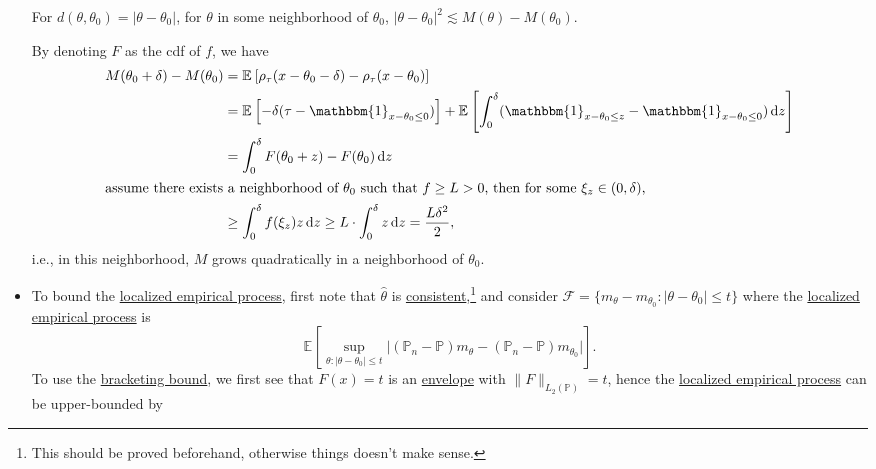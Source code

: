 \begin{explanation}
\begin{itemize}
		      \begin{claim}
			      For \(d(\theta , \theta _0) = \vert \theta - \theta _0 \vert \), for \(\theta \) in some neighborhood of \(\theta _0\), \(\vert \theta - \theta _0 \vert ^2 \lesssim M(\theta ) - M(\theta _0)\).
		      \end{claim}
		      \begin{explanation}
			      By denoting \(F\) as the cdf of \(f\), we have
			      \begin{align*}
				      M(\theta _0 + \delta ) - M(\theta _0)
				       & = \mathbb{E}_{}\left[\rho _\tau (x - \theta _0 - \delta ) - \rho _\tau (x - \theta _0) \right]                                                                                                                              \\
				       & = \mathbb{E}_{}\left[-\delta (\tau - \mathbbm{1}_{x - \theta _0 \leq 0} ) \right] + \mathbb{E}_{}\left[\int_{0}^{\delta } ( \mathbbm{1}_{x - \theta _0 \leq z} - \mathbbm{1}_{x - \theta _0 \leq 0} ) \,\mathrm{d}z \right] \\
				       & = \int_{0}^{\delta } F(\theta _0 + z) - F(\theta _0) \,\mathrm{d}z                                                                                                                                                          \\
				      \shortintertext{assume there exists a neighborhood of \(\theta _0\) such that \(f \geq L > 0\), then for some \(\xi _z \in (0, \delta )\),}
				       & \geq \int_{0}^{\delta } f(\xi _z) z \,\mathrm{d}z
				      \geq L\cdot \int_{0}^{\delta } z \,\mathrm{d}z
				      = \frac{L \delta ^2}{2},
			      \end{align*}
			      i.e., in this neighborhood, \(M\) grows quadratically in a neighborhood of \(\theta _0\).
		      \end{explanation}
		\item To bound the \hyperref[def:localized-EP]{localized empirical process}, first note that \(\hat{\theta} \) is \hyperref[def:consistent]{consistent},\footnote{This should be proved beforehand, otherwise things doesn't make sense.} and consider \(\mathscr{F} = \{ m_\theta - m_{\theta _0} \colon \vert \theta - \theta _0 \vert \leq t \} \) where the \hyperref[def:localized-EP]{localized empirical process} is
		      \[
			      \mathbb{E}_{}\left[\sup _{\theta \colon \vert \theta - \theta _0 \vert \leq t} \vert (\mathbb{P} _n - \mathbb{P} ) m_\theta - (\mathbb{P} _n - \mathbb{P} ) m_{\theta _0} \vert \right].
		      \]
		      To use the \hyperref[thm:bracketing-bound]{bracketing bound}, we first see that \(F(x) = t\) is an \hyperref[def:envelope]{envelope} with \(\lVert F \rVert _{L_2(\mathbb{P} )} = t\), hence the \hyperref[def:localized-EP]{localized empirical process} can be upper-bounded by

\end{itemize}
\end{explanation}
